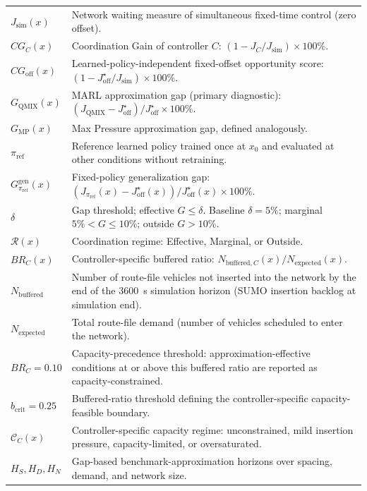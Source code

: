 \documentclass[12pt]{article}
\begin{document}
\begin{longtable}{p{3.8cm}p{11.4cm}}
$J_{\mathrm{sim}}(x)$ & Network waiting measure of simultaneous fixed-time control (zero offset). \\
$CG_C(x)$ & Coordination Gain of controller $C$: $(1-J_C/J_{\mathrm{sim}})\times100\%$. \\
$CG_{\mathrm{off}}(x)$ & Learned-policy-independent fixed-offset opportunity score: $(1-J_{\mathrm{off}}^{\star}/J_{\mathrm{sim}})\times100\%$. \\
$G_{\mathrm{QMIX}}(x)$ & MARL approximation gap (primary diagnostic): $(J_{\mathrm{QMIX}}-J_{\mathrm{off}}^{\star})/J_{\mathrm{off}}^{\star}\times100\%$. \\
$G_{\mathrm{MP}}(x)$ & Max Pressure approximation gap, defined analogously. \\
$\pi_{\mathrm{ref}}$ & Reference learned policy trained once at $x_0$ and evaluated at other conditions without retraining. \\
$G^{\mathrm{gen}}_{\pi_{\mathrm{ref}}}(x)$ & Fixed-policy generalization gap: $(J_{\pi_{\mathrm{ref}}}(x)-J_{\mathrm{off}}^{\star}(x))/J_{\mathrm{off}}^{\star}(x)\times100\%$. \\
$\delta$ & Gap threshold; effective $G\leq\delta$. Baseline $\delta=5\%$; marginal $5\%<G\leq10\%$; outside $G>10\%$. \\
$\mathcal{R}(x)$ & Coordination regime: Effective, Marginal, or Outside. \\
$BR_C(x)$ & Controller-specific buffered ratio: $N_{\mathrm{buffered},C}(x)/N_{\mathrm{expected}}(x)$. \\
$N_{\mathrm{buffered}}$ & Number of route-file vehicles not inserted into the network by the end of the $3600$~s simulation horizon (SUMO insertion backlog at simulation end). \\
$N_{\mathrm{expected}}$ & Total route-file demand (number of vehicles scheduled to enter the network). \\
$BR_C=0.10$ & Capacity-precedence threshold: approximation-effective conditions at or above this buffered ratio are reported as capacity-constrained. \\
$b_{\mathrm{crit}}=0.25$ & Buffered-ratio threshold defining the controller-specific capacity-feasible boundary. \\
$\mathcal{C}_C(x)$ & Controller-specific capacity regime: unconstrained, mild insertion pressure, capacity-limited, or oversaturated. \\
$H_S,H_D,H_N$ & Gap-based benchmark-approximation horizons over spacing, demand, and network size. \\

\end{longtable}
\end{document}
